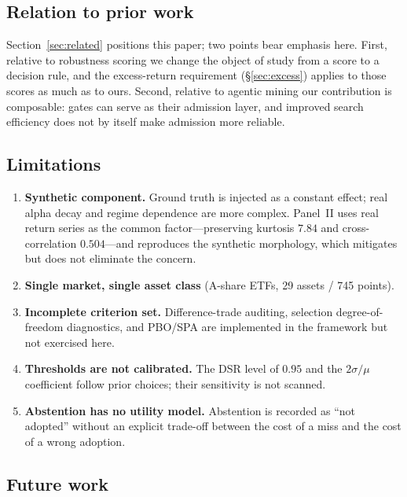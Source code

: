 \documentclass[11pt]{article}
\begin{document}
\subsection{Relation to prior work}

Section~\ref{sec:related} positions this paper; two points bear emphasis here. First, relative
to robustness scoring \citep{minerva,gtscore} we change the object of study from a score to a
decision rule, and the excess-return requirement (\S\ref{sec:excess}) applies to those scores as
much as to ours. Second, relative to agentic mining
\citep{factorMiner,quantaalpha,alphaagent,automate,alphaseek} our contribution is composable:
gates can serve as their admission layer, and improved search efficiency does not by itself make
admission more reliable.

\subsection{Limitations}

\begin{enumerate}\itemsep1pt
\item \textbf{Synthetic component.} Ground truth is injected as a constant effect; real alpha
      decay and regime dependence are more complex. Panel~II uses real return series as the common
      factor---preserving kurtosis $7.84$ and cross-correlation $0.504$---and reproduces the
      synthetic morphology, which mitigates but does not eliminate the concern.
\item \textbf{Single market, single asset class} (A-share ETFs, 29 assets / 745 points).
\item \textbf{Incomplete criterion set.} Difference-trade auditing, selection
      degree-of-freedom diagnostics, and PBO/SPA are implemented in the framework but not
      exercised here.
\item \textbf{Thresholds are not calibrated.} The DSR level of $0.95$ and the $2\sigma/\mu$
      coefficient follow prior choices; their sensitivity is not scanned.
\item \textbf{Abstention has no utility model.} Abstention is recorded as ``not adopted'' without
      an explicit trade-off between the cost of a miss and the cost of a wrong adoption.
\end{enumerate}

\subsection{Future work}
\end{document}
